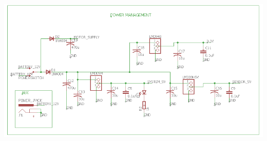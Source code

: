 \documentclass[a4paper,12pt,oneside]{book}
\begin{document}
\begin{enumerate}
    \\\hspace*{-1.5cm}\includegraphics[width=15cm, height=13cm]{powermanage}
    

\end{enumerate}
\end{document}

